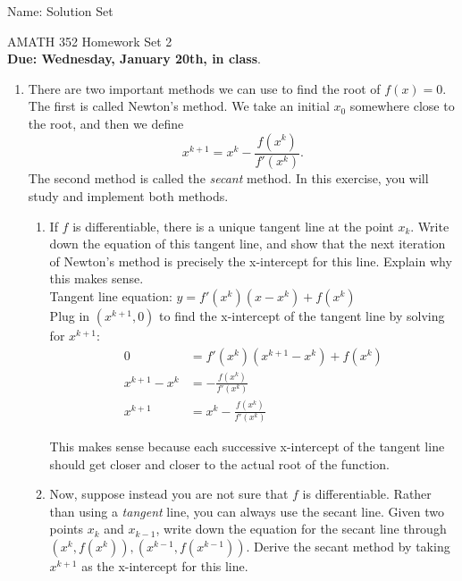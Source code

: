 \documentclass[11pt]{amsart}
\theoremstyle{plain}
\theoremstyle{definition}
\begin{document}
{\Large Name: Solution Set}  \\
\begin{center}
\Large AMATH 352 \hskip 2in Homework Set 2\\
{\bf Due: Wednesday, January 20th, in class}. 
\end{center}
\bigskip




\begin{enumerate}
\item There are two important methods we can use to find the root of $f(x) = 0$. 
The first is called Newton's method. We take an initial $x_0$ somewhere close 
to the root, and then we define
\[
x^{k+1} = x^k - \frac{f(x^k)}{f'(x^k)}.
\]
The second method is called the {\it secant} method. In this exercise, you will 
study and implement both methods. 

\bigskip

\begin{enumerate}

\item If $f$ is differentiable, there is a unique tangent line at the point $x_k$. 
Write down the equation of this tangent line, and show that the next iteration of Newton's method 
is precisely the x-intercept for this line. Explain why this makes sense. \\

Tangent line equation: $y = f'(x^k)(x - x^k) + f(x^k)$ \\
Plug in $(x^{k+1}, 0)$ to find the x-intercept of the tangent line by solving for $x^{k+1}$:
\begin{align} \nonumber
0 &= f'(x^k)(x^{k+1} - x^k) + f(x^k) \\ \nonumber
x^{k+1} - x^{k} &= -\frac{f(x^k)}{f'(x^k)} \\ \nonumber
x^{k+1} &= x^k - \frac{f(x^k)}{f'(x^k)}
\end{align}

This makes sense because each successive x-intercept of the tangent line should get closer and closer to the actual root of the function. 
\bigskip 

\item Now, suppose instead you are not sure that $f$ is differentiable. 
Rather than using a {\it tangent} line, you can always use the secant line. 
Given two points $x_k$ and $x_{k-1}$, write down the 
equation for the secant line through $(x^k, f(x^k)), (x^{k-1}, f(x^{k-1}))$.
Derive the secant method by taking $x^{k+1}$ as the x-intercept 
for this line. \\


\end{enumerate}
\end{enumerate}
\end{document}
